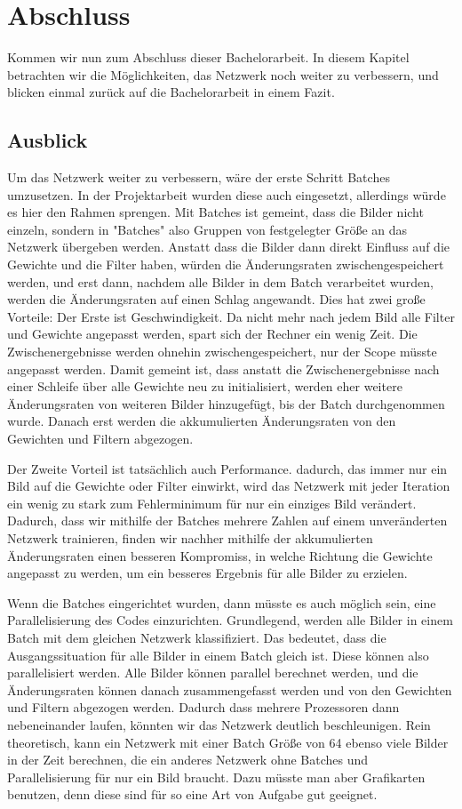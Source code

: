 \documentclass[12pt]{article}
\begin{document}
\section{Abschluss}
Kommen wir nun zum Abschluss dieser Bachelorarbeit. In diesem Kapitel betrachten wir die Möglichkeiten, das Netzwerk noch weiter zu verbessern, und blicken einmal zurück auf die Bachelorarbeit in einem Fazit.

\subsection{Ausblick}
Um das Netzwerk weiter zu verbessern, wäre der erste Schritt Batches umzusetzen. In der Projektarbeit wurden diese auch eingesetzt, allerdings würde es hier den Rahmen sprengen. Mit Batches ist gemeint, dass die Bilder nicht einzeln, sondern in "Batches" also Gruppen von festgelegter Größe an das Netzwerk übergeben werden. Anstatt dass die Bilder dann direkt Einfluss auf die Gewichte und die Filter haben, würden die Änderungsraten zwischengespeichert werden, und erst dann, nachdem alle Bilder in dem Batch verarbeitet wurden, werden die Änderungsraten auf einen Schlag angewandt. Dies hat zwei große Vorteile: Der Erste ist Geschwindigkeit. Da nicht mehr nach jedem Bild alle Filter und Gewichte angepasst werden, spart sich der Rechner ein wenig Zeit. Die Zwischenergebnisse werden ohnehin zwischengespeichert, nur der Scope müsste angepasst werden. Damit gemeint ist, dass anstatt die Zwischenergebnisse nach einer Schleife über alle Gewichte neu zu initialisiert, werden eher weitere Änderungsraten von weiteren Bilder hinzugefügt, bis der Batch durchgenommen wurde. Danach erst werden die akkumulierten Änderungsraten von den Gewichten und Filtern abgezogen.

Der Zweite Vorteil ist tatsächlich auch Performance. dadurch, das immer nur ein Bild auf die Gewichte oder Filter einwirkt, wird das Netzwerk mit jeder Iteration ein wenig zu stark zum Fehlerminimum für nur ein einziges Bild verändert. Dadurch, dass wir mithilfe der Batches mehrere Zahlen auf einem unveränderten Netzwerk trainieren, finden wir nachher mithilfe der akkumulierten Änderungsraten einen besseren Kompromiss, in welche Richtung die Gewichte angepasst zu werden, um ein besseres Ergebnis für alle Bilder zu erzielen. 

Wenn die Batches eingerichtet wurden, dann müsste es auch möglich sein, eine Parallelisierung des Codes einzurichten. Grundlegend, werden alle Bilder in einem Batch mit dem gleichen Netzwerk klassifiziert. Das bedeutet, dass die Ausgangssituation für alle Bilder in einem Batch gleich ist. Diese können also parallelisiert werden. Alle Bilder können parallel berechnet werden, und die Änderungsraten können danach zusammengefasst werden und von den Gewichten und Filtern abgezogen werden. Dadurch dass mehrere Prozessoren dann nebeneinander laufen, könnten wir das Netzwerk deutlich beschleunigen. Rein theoretisch, kann ein Netzwerk mit einer Batch Größe von 64 ebenso viele Bilder in der Zeit berechnen, die ein anderes Netzwerk ohne Batches und Parallelisierung für nur ein Bild braucht. Dazu müsste man aber Grafikarten benutzen, denn diese sind für so eine Art von Aufgabe gut geeignet. 
\end{document}
